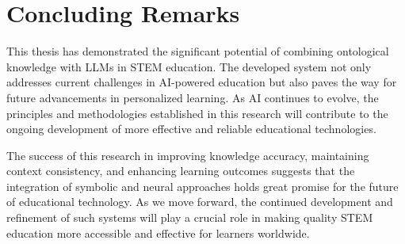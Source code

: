 \section{Concluding Remarks}
\label{sec:concluding-remarks}

This thesis has demonstrated the significant potential of combining ontological knowledge with LLMs in STEM education. The developed system not only addresses current challenges in AI-powered education but also paves the way for future advancements in personalized learning. As AI continues to evolve, the principles and methodologies established in this research will contribute to the ongoing development of more effective and reliable educational technologies.

The success of this research in improving knowledge accuracy, maintaining context consistency, and enhancing learning outcomes suggests that the integration of symbolic and neural approaches holds great promise for the future of educational technology. As we move forward, the continued development and refinement of such systems will play a crucial role in making quality STEM education more accessible and effective for learners worldwide. 